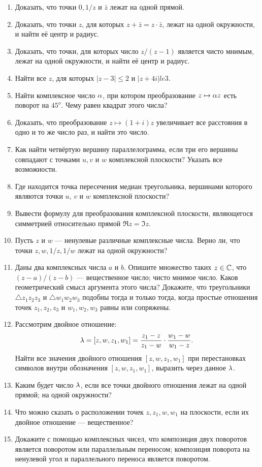 \begin{enumerate}
\item Доказать, что точки $0, 1/z$ и $\bar z$ лежат на одной прямой.
\item Доказать, что точки $z$, для которых $z + \bar z = z \cdot \bar z$, лежат на
одной окружности, и найти её центр и радиус.
\item Доказать, что точки, для которых число $z/(z - 1)$ является
чисто мнимым, лежат на одной окружности, и найти её центр и
радиус.
\item Найти все $z$, для которых $|z - 3| \le 2$ и $|z + 4i| le 3$.
\item Найти комплексное число $\alpha$, при котором преобразование
$z \mapsto \alpha z$ есть поворот на $45^o$. Чему равен квадрат этого числа?
\item Доказать, что преобразование $z \mapsto (1 + i)z$ увеличивает все
расстояния в одно и то же число раз, и найти это число.
\item Как найти четвёртую вершину параллелограмма, если три
его вершины совпадают с точками $u, v$ и $w$ комплексной плоскости?
Указать все возможности.
\item Где находится точка пересечения медиан треугольника, вершинами
 которого являются точки $u$, $v$ и $w$ комплексной плоскости?
\item Вывести формулу для преобразования комплексной плоскости,
 являющегося симметрией относительно прямой $\Re z = \Im z$.
 
\item  Пусть $z$ и $w$ --- ненулевые различные комплексные числа. Верно ли, что точки $z, w, 1/z, 1/w$
лежат на одной окружности?

\item Даны два комплексных числа $a$ и $b$. Опишите множество таких $z \in \mathbb C$, что $(z - a)/(z - b)$ ---
\ipunkt вещественное число;
\ipunkt чисто мнимое число.
\ipunkt Каков геометрический смысл аргумента этого числа?
\ipunkt Докажите, что треугольники $\triangle z_1z_2z_3$ и $\triangle w_1w_2w_3$ подобны тогда и только тогда, когда простые отношения точек $z_1, z_2, z_3$ и $w_1, w_2, w_3$ равны или сопряжены.

\item Рассмотрим двойное отношение:
$$
\lambda= [z,w,z_1,w_1] = \frac{z_1-z}{z_1-w}\cdot\frac{w_1-w}{w_1-z}.
$$
Найти все значения двойного отношения $[z,w,z_1,w_1]$ при перестановках символов внутри обозначения $[z,w,z_1,w_1]$, выразить через данное $\lambda$.

\item Каким будет число $\lambda$, если все точки двойного отношения лежат \ipunkt на одной прямой; \ipunkt на одной окружности?

\item Что можно сказать о расположении точек $z,z_1,w,w_1$ на плоскости, если их двойное отношение --- вещественное?

\item Докажите с помощью комплексных чисел, что
\ipunkt композиция двух поворотов является поворотом или параллельным переносом;
\ipunkt композиция поворота на ненулевой угол и параллельного переноса является поворотом.

\end{enumerate}
